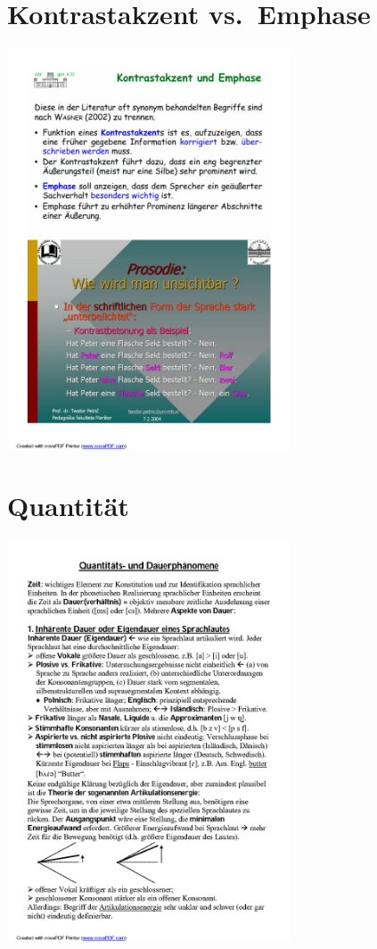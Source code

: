 \documentclass[
  letterpaper,
]{scrbook}
\begin{document}
\hypertarget{kontrastakzent-vs.-emphase}{%
\section{Kontrastakzent vs.~Emphase}\label{kontrastakzent-vs.-emphase}}

\includegraphics[width=3.31in,height=\textheight]{./pictures/prosodie/06_Prosodie_Folie_2005-06_R_Page11.png}

\hypertarget{quantituxe4t}{%
\section{Quantität}\label{quantituxe4t}}

\includegraphics[width=3.31in,height=\textheight]{./pictures/prosodie/06_Prosodie_Folie_2005-06_R_Page12.png}
\end{document}
